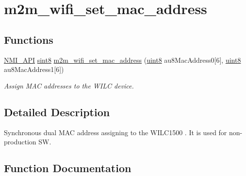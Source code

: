 \hypertarget{group__WifiSetMacAddFn}{}\section{m2m\+\_\+wifi\+\_\+set\+\_\+mac\+\_\+address}
\label{group__WifiSetMacAddFn}
\subsection*{Functions}
\begin{DoxyCompactItemize}
\item 
\hyperlink{group__BSPDefine_gaecc0323d771e41ef81a76b5f12783e22}{N\+M\+I\+\_\+\+A\+PI} \hyperlink{group__DataT_gae35f10ffd0ac8dd2bc3e794da9bdfbc7}{sint8} \hyperlink{group__WifiSetMacAddFn_gae9a57d265b208dbd4a1dbc79e6ac5278}{m2m\+\_\+wifi\+\_\+set\+\_\+mac\+\_\+address} (\hyperlink{group__DataT_ga4df709a77647e870bbf1d955b8edc9a6}{uint8} au8\+Mac\+Address0\mbox{[}6\mbox{]}, \hyperlink{group__DataT_ga4df709a77647e870bbf1d955b8edc9a6}{uint8} au8\+Mac\+Address1\mbox{[}6\mbox{]})
\begin{DoxyCompactList}\small\item\em Assign M\+AC addresses to the W\+I\+LC device. \end{DoxyCompactList}\end{DoxyCompactItemize}


\subsection{Detailed Description}
Synchronous dual M\+AC address assigning to the W\+I\+L\+C1500 . It is used for non-\/production SW. 

\subsection{Function Documentation}
\mbox{\label{group__WifiSetMacAddFn_gae9a57d265b208dbd4a1dbc79e6ac5278}} 
